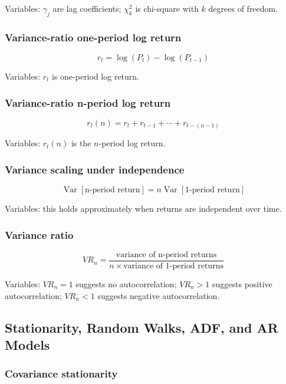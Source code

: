 \documentclass[
  8pt,
  twocolumn]{extarticle}
\begin{document}
Variables: \(\gamma_j\) are lag coefficients; \(\chi_k^2\) is chi-square
with \(k\) degrees of freedom.

\subsubsection{Variance-ratio one-period log
return}\label{variance-ratio-one-period-log-return}

\[
r_t=\log(P_t)-\log(P_{t-1})
\]

Variables: \(r_t\) is one-period log return.

\subsubsection{Variance-ratio n-period log
return}\label{variance-ratio-n-period-log-return}

\[
r_t(n)=r_t+r_{t-1}+\cdots+r_{t-(n-1)}
\]

Variables: \(r_t(n)\) is the \(n\)-period log return.

\subsubsection{Variance scaling under
independence}\label{variance-scaling-under-independence}

\[
\operatorname{Var}[\text{n-period return}]=n\operatorname{Var}[\text{1-period return}]
\]

Variables: this holds approximately when returns are independent over
time.

\subsubsection{Variance ratio}\label{variance-ratio}

\[
VR_n=\frac{\text{variance of n-period returns}}{n\times\text{variance of 1-period returns}}
\]

Variables: \(VR_n=1\) suggests no autocorrelation; \(VR_n>1\) suggests
positive autocorrelation; \(VR_n<1\) suggests negative autocorrelation.

\subsection{Stationarity, Random Walks, ADF, and AR
Models}\label{stationarity-random-walks-adf-and-ar-models}

\subsubsection{Covariance stationarity}\label{covariance-stationarity}
\end{document}
